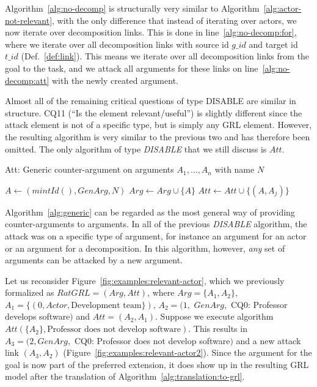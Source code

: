Algorithm~\ref{alg:no-decomp} is structurally very similar to Algorithm~\ref{alg:actor-not-relevant}, with the only difference that instead of iterating over actors, we now iterate over decomposition links. This is done in line~\ref{alg:no-decomp:for}, where we iterate over all decomposition links with source id $g\_id$ and target id $t\_id$ (Def.~\ref{def:link}). This means we iterate over all decomposition links from the goal to the task, and we attack all arguments for these links on line~\ref{alg:no-decomp:att} with the newly created argument.

Almost all of the remaining critical questions of type DISABLE are similar in structure. CQ11 (``Is the element relevant/useful'') is slightly different since the attack element is not of a specific type, but is simply any GRL element. However, the resulting algorithm is very similar to the previous two and has therefore been omitted. The only algorithm of type \emph{DISABLE} that we still discuss is $Att$.

\begin{algorithm}[h]
  \caption{Att: Generic counter-argument on arguments $A_1,\ldots,A_n$ with name $N$}\label{alg:generic}
  \begin{algorithmic}[1]
    \State $A \leftarrow (mintId(),GenArg, N)$\label{alg:generic:arg}
    \State $Arg\leftarrow Arg \cup \{A\}$\label{alg:generic:addarg}
    \label{alg:generic:for}
      \State $Att \leftarrow Att \cup \{(A,A_j)\}$\label{alg:generic:att}
    \EndFor
    \EndProcedure
  \end{algorithmic}
\end{algorithm}

Algorithm~\ref{alg:generic} can be regarded as the most general way of providing counter-arguments to arguments. In all of the previous \emph{DISABLE} algorithm, the attack was on a specific type of argument, for instance an argument for an actor or an argument for a decomposition. In this algorithm, however, \emph{any} set of arguments can be attacked by a new argument.

Let us reconsider Figure~\ref{fig:examples:relevant-actor}, which we previously formalized as $RatGRL=(Arg,Att)$, where $Arg=\{A_1,A_2\}$, $A_1 = \{(0,Actor,\text{Development team}\})$, $A_2= (1,$ $GenArg,$ CQ0: Professor develops software$)$ and $Att=(A_2,A_1)$. Suppose we execute algorithm $Att(\{A_2\}, \text{Professor does not develop software})$. This results in $A_3=(2, GenArg,$ CQ0: Professor does not develop software$)$ and a new attack link $(A_3,A_2)$ (Figure~\ref{fig:examples:relevant-actor2}). Since the argument for the goal is now part of the preferred extension, it does show up in the resulting GRL model after the translation of Algorithm~\ref{alg:translation:to-grl}.

